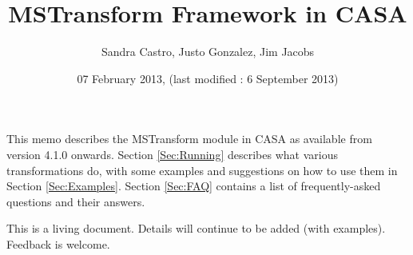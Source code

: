 \documentclass[11pt]{article}
\begin{document}
\title{MSTransform Framework in CASA}
\author{Sandra Castro, Justo Gonzalez, Jim Jacobs}
\date{07 February 2013, (last modified : 6 September 2013)}
\maketitle

This memo describes the MSTransform module in CASA as available from version
4.1.0 onwards.
Section \ref{Sec:Running} 
describes what 
various transformations do, with some examples and suggestions on how to use them in
Section \ref{Sec:Examples}. 
Section \ref{Sec:FAQ} contains a list of frequently-asked questions and their answers.

This is a living document. Details will continue to be added (with examples). Feedback is welcome.

\tableofcontents

%


\end{document}
